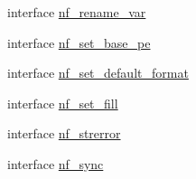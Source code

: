 \begin{DoxyCompactItemize}
\item 
interface \hyperlink{interfacenetcdf__nf__interfaces_1_1nf__rename__var}{nf\+\_\+rename\+\_\+var}
\item 
interface \hyperlink{interfacenetcdf__nf__interfaces_1_1nf__set__base__pe}{nf\+\_\+set\+\_\+base\+\_\+pe}
\item 
interface \hyperlink{interfacenetcdf__nf__interfaces_1_1nf__set__default__format}{nf\+\_\+set\+\_\+default\+\_\+format}
\item 
interface \hyperlink{interfacenetcdf__nf__interfaces_1_1nf__set__fill}{nf\+\_\+set\+\_\+fill}
\item 
interface \hyperlink{interfacenetcdf__nf__interfaces_1_1nf__strerror}{nf\+\_\+strerror}
\item 
interface \hyperlink{interfacenetcdf__nf__interfaces_1_1nf__sync}{nf\+\_\+sync}
\end{DoxyCompactItemize}
